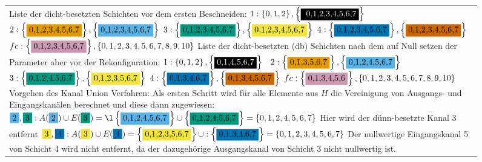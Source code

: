 \begin{figure}
\begin{minipage}[c]{1\linewidth}
\begin{tabularx}{1\linewidth}{m{0.22\linewidth}m{0.88\linewidth}}
\multicolumn{2}{m{1\linewidth}}{Liste der dicht-besetzten Schichten vor dem ersten Beschneiden:\newline
$1:\left\{0,1,2\right\},\left\{\colorbox{black}{ \textcolor{white}{0,1,2,3,4,5,6,7}} \right\}\; \;$
$2:\left\{\colorbox{orange}{0,1,2,3,4,5,6,7}\right\},\left\{\colorbox{sky}{0,1,2,3,4,5,6,7}\right\}$\newline
$3:\left\{\colorbox{bluegreen}{0,1,2,3,4,5,6,7}\right\},\left\{\colorbox{yellow}{0,1,2,3,4,5,6,7}\right\}$\newline
$4:\left\{\colorbox{blue2}{0,1,2,3,4,5,6,7}\right\},\left\{\colorbox{vermi}{0,1,2,3,4,5,6,7}\right\}$\newline
$fc:\left\{\colorbox{purple}{0,1,2,3,4,5,6,7}\right\},\left\{0,1,2,3,4,5,6,7,8,9,10\right\}$ \newline
Liste der dicht-besetzten (db) Schichten nach dem auf Null setzen der Parameter aber vor der Rekonfiguration:\newline
$1:\left\{0,1,2\right\},\left\{\colorbox{black}{\textcolor{white}{0,1,4,5,6,7}}\right\} \; \;$
$2:\left\{\colorbox{orange}{0,1,3,5,6,7}\right\},\left\{\colorbox{sky}{0,1,2,4,5,6,7}\right\}$\newline
$3:\left\{\colorbox{bluegreen}{0,1,2,4,5,6,7}\right\},\left\{\colorbox{yellow}{0,1,2,3,5,6,7}\right\}$\newline
$4:\left\{\colorbox{blue2}{0,1,3,4,6,7}\right\},\left\{\colorbox{vermi}{0,1,3,4,5,6,7}\right\}$\newline
$fc:\left\{\colorbox{purple}{0,1,3,4,5,6}\right\},\left\{0,1,2,3,4,5,6,7,8,9,10\right\}$\newline
Vorgehen des Kanal Union Verfahren:
Als ersten Schritt wird für alle Elemente aus $H$ die Vereinigung von Ausgangs- und Eingangskanälen berechnet und diese dann zugewiesen:\newline
$\colorbox{sky}{2},\colorbox{bluegreen}{3}:A(\colorbox{sky}{2}) \cup E(\colorbox{bluegreen}{3})= \l\left\{\colorbox{sky}{0,1,2,4,5,6,7}\right\} \cup \left\{\colorbox{bluegreen}{0,1,2,4,5,6,7}\right\} =\left\{0,1,2,4,5,6,7\right\} $\newline
Hier wird der dünn-besetzte Kanal 3 entfernt \newline
$\colorbox{yellow}{3},\colorbox{blue2}{4}: A(\colorbox{yellow}{3}) \cup E(\colorbox{blue2}{4}) =
\left\{\colorbox{yellow}{0,1,2,3,5,6,7}\right\} \cup :\left\{\colorbox{blue2}{0,1,3,4,6,7}\right\} =\left\{0,1,2,3,4,5,6,7\right\}$\newline
Der nullwertige Eingangskanal 5 von Schicht 4 wird nicht entfernt, da der dazugehörige Ausgangskanal von Schicht 3 nicht nullwertig ist.
}
\end{tabularx}
\end{minipage}
\end{figure}
